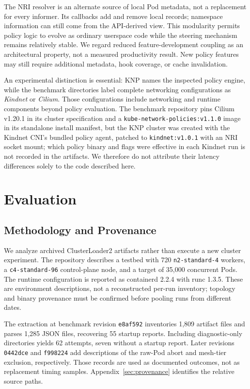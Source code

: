 \documentclass[letterpaper,twocolumn,10pt]{article}
\newcommand{\sys}{\textsc{KNP}}
\begin{document}
The NRI resolver is an alternate source of local Pod metadata, not a
replacement for every informer. Its callbacks add and remove local
records; namespace information can still come from the API-derived
view. This modularity permits policy logic to evolve as ordinary
userspace code while the steering mechanism remains relatively stable.
We regard reduced feature-development coupling as an architectural
property, not a measured productivity result. New policy features may
still require additional metadata, hook coverage, or cache invalidation.

An experimental distinction is essential: \sys{} names the inspected
policy engine, while the benchmark directories label complete networking
configurations as \emph{Kindnet} or \emph{Cilium}. Those configurations
include networking and runtime components beyond policy evaluation.
The benchmark repository pins Cilium v1.20.1 in its cluster specification
and a \texttt{kube-network-policies:v1.1.0} image in its standalone
install manifest, but the \sys{} cluster was created with the Kindnet
CNI's bundled policy agent, patched to \texttt{kindnet:v1.0.1} with an
NRI socket mount; which policy binary and flags were effective in each
Kindnet run is not recorded in the artifacts. We therefore do not
attribute their latency differences solely to the code described here.

\section{Evaluation}
\label{sec:evaluation}
\subsection{Methodology and Provenance}
We analyze archived ClusterLoader2 artifacts rather than execute a new
cluster experiment. The repository describes a testbed with 720
\texttt{n2-standard-4} workers, a \texttt{c4-standard-96} control-plane
node, and a target of 35,000 concurrent Pods. The runtime configuration
is reported as containerd 2.2.4 with runc 1.3.5. These are environment
descriptions, not a reconstructed per-run inventory; topology and binary
provenance must be confirmed before pooling runs from different dates.

The extraction at benchmark revision \texttt{e8af592} inventories 1,809
artifact files and parses 1,285 JSON files, recovering 55 startup reports.
Including diagnostic-only directories yields 62 attempts, seven without
a startup report. Later revisions \texttt{0442dce} and \texttt{f998224}
add descriptions of the raw-Pod abort and mesh-tier exclusion, respectively.
Those records are used as documented outcomes, not as replacement timing
samples. Appendix~\ref{sec:provenance} identifies the relative source paths.
\end{document}
